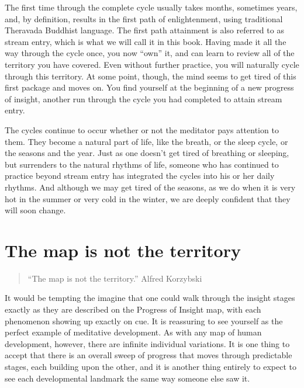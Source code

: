 \documentclass[a5paper,10pt,english]{book}
\begin{document}
\sphinxAtStartPar
The first time through the complete cycle usually takes months,
sometimes years, and, by definition, results in the first path of
enlightenment, using traditional Theravada Buddhist language. The first
path attainment is also referred to as stream entry, which is what we
will call it in this book. Having made it all the way through the cycle
once, you now “own” it, and can learn to review all of the territory you
have covered. Even without further practice, you will naturally cycle
through this territory. At some point, though, the mind seems to get
tired of this first package and moves on. You find yourself at the
beginning of a new progress of insight, another run through the cycle
you had completed to attain stream entry.

\sphinxAtStartPar
The cycles continue to occur whether or not the meditator pays attention
to them. They become a natural part of life, like the breath, or the
sleep cycle, or the seasons and the year. Just as one doesn’t get tired
of breathing or sleeping, but surrenders to the natural rhythms of life,
someone who has continued to practice beyond stream entry has integrated
the cycles into his or her daily rhythms. And although we may get tired
of the seasons, as we do when it is very hot in the summer or very cold
in the winter, we are deeply confident that they will soon change.


\section{The map is not the territory}
\label{\detokenize{main-2:the-map-is-not-the-territory}}\begin{quote}

\sphinxAtStartPar
“The map is not the territory.” \sphinxhyphen{}Alfred Korzybski
\end{quote}

\sphinxAtStartPar
It would be tempting the imagine that one could walk through the insight
stages exactly as they are described on the Progress of Insight map,
with each phenomenon showing up exactly on cue. It is reassuring to see
yourself as the perfect example of meditative development. As with any
map of human development, however, there are infinite individual
variations. It is one thing to accept that there is an overall sweep of
progress that moves through predictable stages, each building upon the
other, and it is another thing entirely to expect to see each
developmental landmark the same way someone else saw it.
\end{document}

